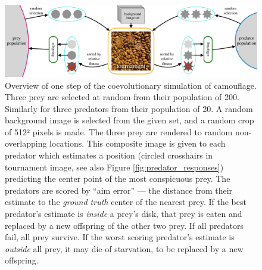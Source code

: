 \documentclass[letterpaper]{article}
\newcommand{\jargon}[1]{\textit{#1}}
\begin{document}
\begin{figure}
    \includegraphics[width=\textwidth]{coc_overview.pdf}
    \caption{Overview of one step of the coevolutionary simulation of camouflage. Three prey are selected at random from their population of 200. Similarly for three predators from their population of 20. A random background image is selected from the given set, and a random crop of 512² pixels is made. The three prey are rendered to random non-overlapping locations. This composite image is given to each predator which estimates a position (circled crosshairs in tournament image, see also Figure \ref{fig:predator_responses}) predicting the center point of the most conspicuous prey. The predators are scored by “aim error” — the distance from their estimate to the \jargon{ground truth} center of the nearest prey. If the best predator's estimate is \textit{inside} a prey's disk, that prey is eaten and replaced by a new offspring of the other two prey. If all predators fail, all prey survive. If the worst scoring predator's estimate is \textit{outside} all prey, it may die of starvation, to be replaced by a new offspring.}
    \label{fig:simulation_overview}
\end{figure}

\end{document}
